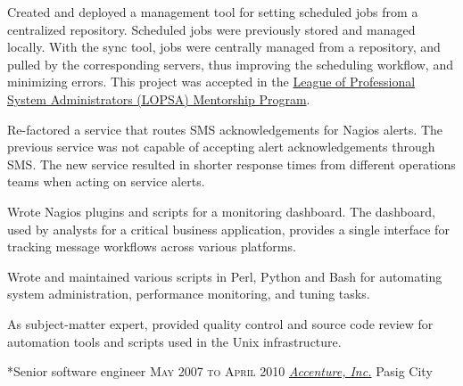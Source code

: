 \documentclass[10pt, a4paper, final]{article}
\begin{document}
\begin{section}
\begin{subsection}
\begin{compactitem}
      \item Created and deployed a management tool for setting scheduled jobs from a centralized repository. Scheduled jobs were previously stored and managed locally. With the sync tool, jobs were centrally managed from a repository, and pulled by the corresponding servers, thus improving the scheduling workflow, and minimizing errors. This project was accepted in the \href{https://lopsa.org/mentor}{League of Professional System Administrators (LOPSA) Mentorship Program}.
      \item Re-factored a service that routes SMS acknowledgements for Nagios alerts. The previous service was not capable of accepting alert acknowledgements through SMS. The new service resulted in shorter response times from different operations teams when acting on service alerts.
      \item Wrote Nagios plugins and scripts for a monitoring dashboard. The dashboard, used by analysts for a critical business application, provides a single interface for tracking message workflows across various platforms.
      \item Wrote and maintained various scripts in Perl, Python and Bash for automating system administration, performance monitoring, and tuning tasks.
      \item As subject-matter expert, provided quality control and source code review for automation tools and scripts used in the Unix infrastructure.
      
    \end{compactitem}
  \end{subsection}
  \vspace{2em}

  \begin{subsection}*{Senior software engineer \hfill\textsc{May 2007 to April 2010}}
    \href{http://www.accenture.com}{\textit{Accenture, Inc.}} \hfill Pasig City
    \vspace{1em}


\end{subsection}
\end{section}
\end{document}

